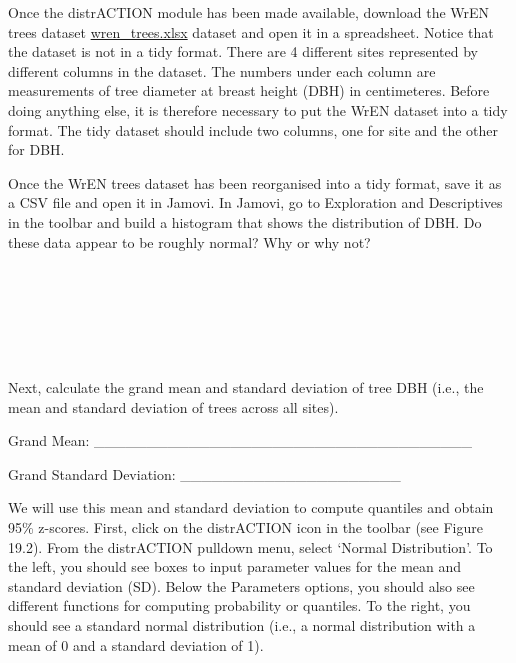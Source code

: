 \documentclass[
]{scrbook}
\begin{document}
Once the distrACTION module has been made available, download the WrEN trees dataset \href{https://raw.githubusercontent.com/bradduthie/statistical_techniques/main/data/wren_trees.xlsx}{wren\_trees.xlsx} dataset and open it in a spreadsheet.
Notice that the dataset is not in a tidy format.
There are 4 different sites represented by different columns in the dataset.
The numbers under each column are measurements of tree diameter at breast height (DBH) in centimeteres.
Before doing anything else, it is therefore necessary to put the WrEN dataset into a tidy format.
The tidy dataset should include two columns, one for site and the other for DBH.

Once the WrEN trees dataset has been reorganised into a tidy format, save it as a CSV file and open it in Jamovi.
In Jamovi, go to Exploration and Descriptives in the toolbar and build a histogram that shows the distribution of DBH.
Do these data appear to be roughly normal?
Why or why not?

\begin{verbatim}






\end{verbatim}

Next, calculate the grand mean and standard deviation of tree DBH (i.e., the mean and standard deviation of trees across all sites).

Grand Mean: \_\_\_\_\_\_\_\_\_\_\_\_\_\_\_\_\_\_\_\_\_\_\_\_\_\_\_\_\_\_\_\_\_\_\_\_

Grand Standard Deviation: \_\_\_\_\_\_\_\_\_\_\_\_\_\_\_\_\_\_\_\_\_

We will use this mean and standard deviation to compute quantiles and obtain 95\% z-scores.
First, click on the distrACTION icon in the toolbar (see Figure 19.2).
From the distrACTION pulldown menu, select `Normal Distribution'.
To the left, you should see boxes to input parameter values for the mean and standard deviation (SD).
Below the Parameters options, you should also see different functions for computing probability or quantiles.
To the right, you should see a standard normal distribution (i.e., a normal distribution with a mean of 0 and a standard deviation of 1).
\end{document}
